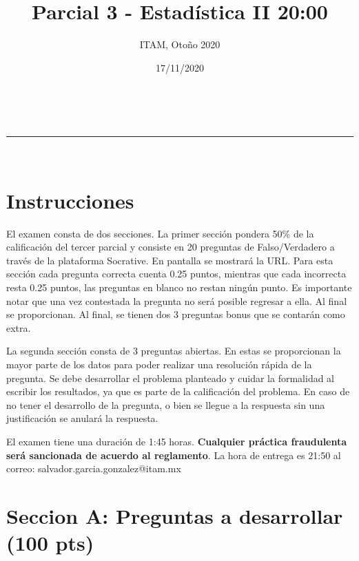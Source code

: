 \documentclass[addpoints]{exam}
\makeatletter
\newcommand{\linia}{\rule{\linewidth}{0.5pt}}
\theoremstyle{mytheor}
\renewcommand{\maketitle}{
    \begin{center}
    \vspace{2ex}
    {\huge \textsc{\@title}}
    \vspace{1ex}
    \\
    \linia\\
    \@author \hfill \@date
    \vspace{4ex}
    \end{center}
  }
\makeatother
\begin{document}
  
  \title{Parcial 3 - Estadística II 20:00 }
  
  \author{ITAM, Otoño 2020}
  
  \date{17/11/2020}
  
  \maketitle
  
  \section*{Instrucciones}
  
El examen consta de dos secciones. La primer sección pondera 50\% de la calificación del tercer parcial y consiste en 20 preguntas de Falso/Verdadero a través de la plataforma Socrative. En pantalla se mostrará la URL. Para esta sección cada pregunta correcta cuenta 0.25 puntos, mientras que cada incorrecta resta 0.25 puntos, las preguntas en blanco no restan ningún punto. Es importante notar que una vez contestada la pregunta no será posible regresar a ella. Al final se proporcionan. Al final, se tienen dos 3 preguntas bonus que se contarán como extra. 
 
 \vspace{10pt}
 
La segunda sección consta de 3 preguntas abiertas. En estas se proporcionan la mayor parte de los datos para poder realizar una resolución rápida de la pregunta. Se debe desarrollar el problema planteado y cuidar la formalidad al escribir los resultados, ya que es parte de la calificación del problema. En caso de no tener el desarrollo de la pregunta, o bien se llegue a la respuesta sin una justificación se anulará la respuesta. 

\vspace{10pt}
  
El examen tiene una duración de 1:45 horas. \textbf{Cualquier práctica fraudulenta será sancionada de acuerdo al reglamento}. La hora de entrega es 21:50 al correo: salvador.garcia.gonzalez@itam.mx

\section*{Seccion A: Preguntas a desarrollar (100 pts)}
  
\end{document}
